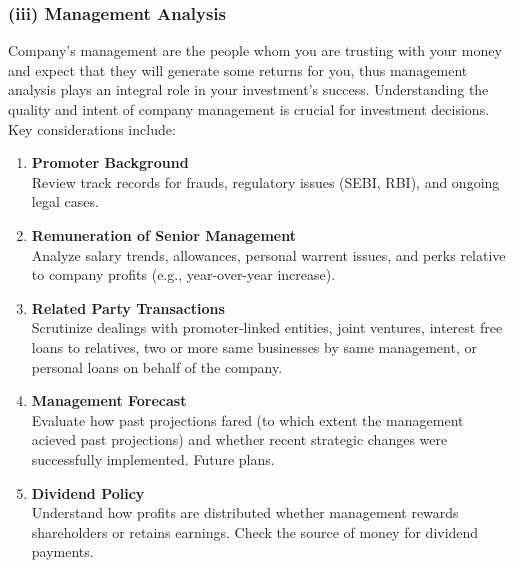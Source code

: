 \documentclass[12pt]{article}
\begin{document}
\subsubsection*{(iii) Management Analysis}
Company's management are the people whom you are trusting with your money and expect that they will generate some returns for you, thus management analysis plays an integral role in your investment's success.
Understanding the quality and intent of company management is crucial for investment decisions. Key considerations include:

\begin{enumerate}
    \item \textbf{Promoter Background} \\
    Review track records for frauds, regulatory issues (SEBI, RBI), and ongoing legal cases.
  
    \item \textbf{Remuneration of Senior Management} \\
    Analyze salary trends, allowances, personal warrent issues, and perks relative to company profits (e.g., year-over-year increase).
  
    \item \textbf{Related Party Transactions} \\
    Scrutinize dealings with promoter-linked entities, joint ventures, interest free loans to relatives, two or more same businesses by same management, or personal loans on behalf of the company.
  
    \item \textbf{Management Forecast} \\
    Evaluate how past projections fared (to which extent the management acieved past projections) and whether recent strategic changes were successfully implemented. Future plans.
  
    \item \textbf{Dividend Policy} \\
    Understand how profits are distributed whether management rewards shareholders or retains earnings. Check the source of money for dividend payments.


\end{enumerate}
\end{document}
